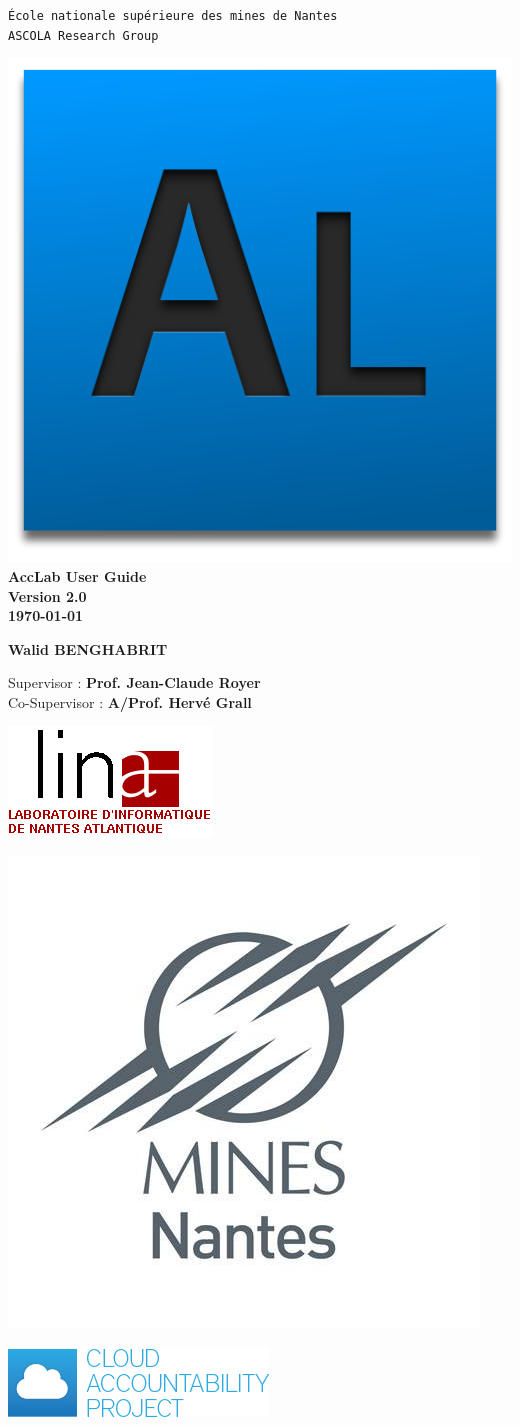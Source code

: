 \begin{titlepage}

\thispagestyle{empty}

\begin{center}
	\large{\texttt{École nationale supérieure des mines de Nantes}}\\
	\large{\texttt{ASCOLA Research Group}}
\end{center}

\noindent
\vspace{0.5cm}

\begin{center}
	\includegraphics[height=14ex,keepaspectratio,angle=20]{assets/acclab.png}
	\Huge{\textbf{AccLab User Guide}} \\ \vspace{0.5cm} \large{\textbf{Version 2.0}} \\
	\vspace{0.4cm}
	\large{\textbf{\today}}
	\normalsize
	\vspace{4.0cm}

	\begin{center}
	  \textbf{Walid BENGHABRIT}
	\end{center}

	\vspace{2mm}
	Supervisor : \textbf{Prof. Jean-Claude Royer} \\
	Co-Supervisor : \textbf{A/Prof. Hervé Grall}

\end{center}

\vspace{4.5cm}
\parbox{0.33\linewidth}{ \includegraphics[height=9ex,keepaspectratio]{assets/lina_logo.png}}
\parbox{0.33\linewidth}{ \includegraphics[height=15.7ex,keepaspectratio]{assets/enmLogo.jpg}}
\parbox{0.33\linewidth}{ \includegraphics[height=7.0ex,keepaspectratio]{assets/a4cloud.png}}

\end{titlepage}
